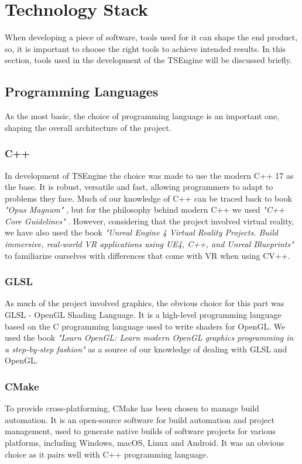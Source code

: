 \newpage
\section{Technology Stack}
\hspace{\parindent}
When developing a piece of software, tools used for it can shape the end product, so, it is important to choose the right tools to achieve intended results. In this section, tools used in the development of the TSEngine will be discussed briefly.

\subsection{Programming Languages}
\hspace{\parindent}
As the most basic, the choice of programming language is an important one, shaping the overall architecture of the project.
\subsubsection{C++}
\hspace{\parindent}
In development of TSEngine the choice was made to use the modern C++ 17 as the base. It is robust, versatile and fast, allowing programmers to adapt to problems they face. Much of our knowledge of C++ can be traced back to book \textit{"Opus Magnum"} \cite{OpusMagnum}, but for the philosophy behind modern C++ we used \textit{"C++ Core Guidelines"} \cite{CppCoreGuidelines}. However, considering that the project involved virtual reality, we have also used the book \textit{"Unreal Engine 4 Virtual Reality Projects. Build immersive, real-world VR applications using UE4, C++, and Unreal Blueprints"} \cite{UE4VRProjects} to familiarize ourselves with differences that come with VR when using CV++. 
\subsubsection{GLSL}
\hspace{\parindent}
\label{sec:glsl}
As much of the project involved graphics, the obvious choice for this part was GLSL - OpenGL Shading Language. It is a high-level programming language based on the C programming language used to write shaders for OpenGL. We used the book \textit{"Learn OpenGL: Learn modern OpenGL graphics programming in a step-by-step fashion"} \cite{learnopengl} as a source of our knowledge of dealing with GLSL and OpenGL.

\subsubsection{CMake}
\hspace{\parindent}
\label{sec:stack_cmake}
To provide cross-platforming, CMake has been chosen to manage build automation. It is an open-source software for build automation and project management, used to generate native builds of software projects for various platforms, including Windows, macOS, Linux and Android. It was an obvious choice as it pairs well with C++ programming language.

